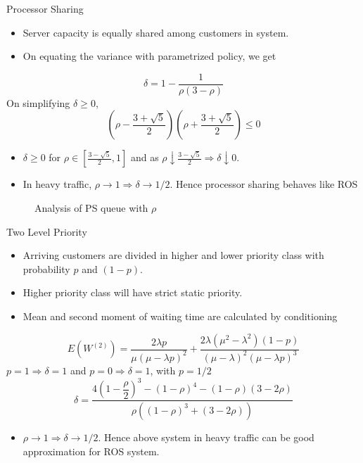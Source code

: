 \documentclass[compress, serif, onlymath, professionalfonts]{beamer}
\begin{document}
\begin{frame}{Processor Sharing}
\begin{itemize}
\item Server capacity is equally shared among customers in system.
\item On equating the variance with parametrized policy, we get
\end{itemize}
$$\delta = 1-\dfrac{1}{\rho(3-\rho)}$$
On simplifying $\delta \geq 0$,\small{$$\left(\rho - \frac{3+\sqrt{5}}{2}\right)\left(\rho + \frac{3+\sqrt{5}}{2}\right) \leq 0$$}
\begin{block}{}
\begin{itemize}
\item $\delta \geq 0$ for $\rho \in [\frac{3 - \sqrt{5}}{2},1]$ and as $\rho \downarrow \frac{3 - \sqrt{5}}{2} \Rightarrow \delta \downarrow 0$. 
\item In heavy traffic, $\rho \rightarrow 1 \Rightarrow \delta \rightarrow 1/2$. Hence processor sharing behaves like ROS 
\end{itemize}
\end{block}
\end{frame}
\begin{frame}
\begin{figure}[htb!]
\centering
\resizebox{0.79 \textwidth}{!}{}
\caption{Analysis of PS queue with $\rho$}
\end{figure}
\end{frame}
\begin{frame}{Two Level Priority}
\begin{itemize}
\item Arriving customers are divided in higher and lower priority class with probability $p$ and $(1-p)$.
\item Higher priority class will have strict static
priority.
\item Mean and second moment of waiting time are calculated by conditioning
\end{itemize}\scriptsize
$$E(W^{(2)}) = \dfrac{2\lambda p}{\mu(\mu-\lambda p)^2} + \dfrac{2\lambda(\mu^2-\lambda^2)(1-p)}{(\mu-\lambda)^2(\mu-\lambda p )^3}$$
$p=1\Rightarrow \delta = 1$ and $p=0\Rightarrow \delta = 1$, with $p=1/2$
$$\delta = \dfrac{4\left(1-\dfrac{\rho}{2}\right)^3- (1-\rho)^4 - (1-\rho)(3-2\rho)}{\rho((1-\rho)^3 + (3-2\rho))}$$
\begin{block}{}
\begin{itemize}
\item $\rho \rightarrow 1 \Rightarrow \delta \rightarrow 1/2$. Hence above system in heavy traffic can be good approximation for ROS system.

\end{itemize}
\end{block}
\end{frame}
\end{document}
